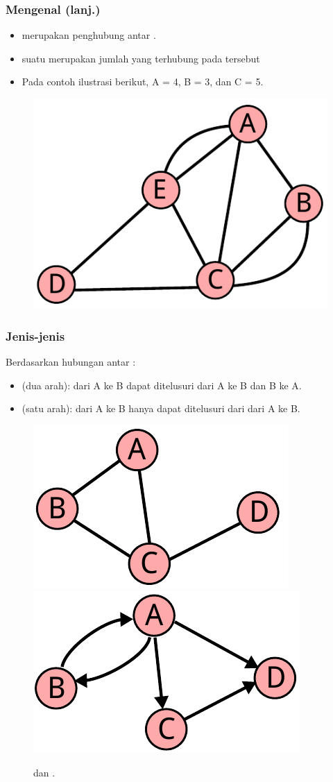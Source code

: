\begin{frame}
\frametitle{Mengenal \fGraph (lanj.)}
\begin{itemize}
  \item \fEdge merupakan penghubung antar \fnode.
  \item \alert{\fDegree} suatu \fnode merupakan jumlah \fedge yang terhubung pada \fnode tersebut
  \item Pada contoh ilustrasi berikut, \fdegree \fnode A = 4, \fdegree \fnode B = 3, dan \fdegree \fnode C = 5.
\end{itemize}
\begin{figure}
  \centering
  \includegraphics[width=4 cm]{asset/graph.pdf}
\end{figure}
\end{frame}

\begin{frame}
\frametitle{Jenis-jenis \fGraph}
Berdasarkan hubungan antar \fnode:
\begin{itemize}
  \item {} \fgraph (dua arah): \fedge dari A ke B dapat ditelusuri dari A ke B dan B ke A. 
  \item {} \fgraph (satu arah): \fedge dari A ke B hanya dapat ditelusuri dari dari A ke B.
\end{itemize}
\begin{figure}
  \centering
  \includegraphics[width=4 cm]{asset/unweighted-undirected.pdf}
  \ \ \ \ \ \ %
  \includegraphics[width=4 cm]{asset/unweighted-directed.pdf}
  
   dan  \fgraph.
\end{figure}
\end{frame}

